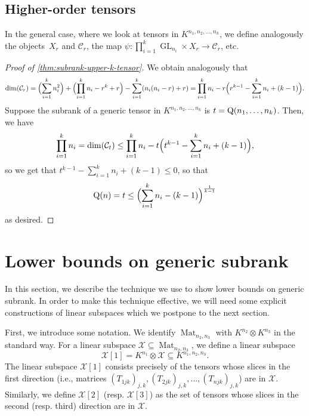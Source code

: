 \documentclass[11pt]{article}
\theoremstyle{definition}
\theoremstyle{remark}
\newcommand{\gensubrank}{{\rm Q}}
\newcommand{\GL}{\operatorname{GL}}
\newcommand{\Mat}{\operatorname{Mat}}
\begin{document}
\subsection{Higher-order tensors}
In the general case, where we look at tensors in $K^{n_1,n_2,\dots,n_k}$, we define analogously the objects~$X_r$ and $\mathcal{C}_r$, the map $\psi: \prod_{i=1}^k \GL_{n_i} \times X_r \rightarrow \mathcal{C}_r$, etc. 

\begin{proof} [Proof of \autoref{thm:subrank-upper-k-tensor}]
We obtain analogously that 
$$
\dim(\mathcal{C}_r) = \Bigl(\sum_{i=1}^k n_i^2\Bigr) + \Bigl(\prod_{i=1}^k n_i - r^k + r\Bigr) - \sum_{i=1}^k (n_i(n_i - r) + r) = \prod_{i=1}^k n_i - r\Bigl(r^{k-1} - \sum_{i=1}^k n_i + (k-1)\Bigr).
$$
Suppose the subrank of a generic tensor in $K^{n_1,n_2,\dots,n_k}$ is $t = \gensubrank(n_1,\ldots,n_k)$. Then, we have
$$
\prod_{i=1}^k n_i = \dim(\mathcal{C}_t) \leq \prod_{i=1}^k n_i - t\Bigl(t^{k-1} - \sum_{i=1}^k n_i + (k-1)\Bigr),
$$
so we get that $t^{k-1} - \sum_{i=1}^k n_i + (k-1) \leq 0$, so that 
\[
\gensubrank(n) = t \leq \Bigl(\sum_{\smash{i=1}}^k n_i - (k-1)\Bigr)^{\frac{1}{k-1}}
\]
as desired.
\end{proof}












\section{Lower bounds on generic subrank}\label{sec:lower-bounds}

In this section, we describe the technique we use to show lower bounds on generic subrank. In order to make this technique effective, we will need some explicit constructions of linear subspaces which we postpone to the next section. 

First, we introduce some notation. We identify $\Mat_{n_2,n_3}$ with $K^{n_2} \otimes K^{n_3}$ in the standard way. For a linear subspace $\mathcal{X} \subseteq \Mat_{n_2,n_3}$, we define a linear subspace
$$
\mathcal{X}[1] = K^{n_1} \otimes \mathcal{X} \subseteq K^{n_1,n_2,n_3}.
$$
The linear subspace $\mathcal{X}[1]$ consists precisely of the tensors whose slices in the first direction (i.e., matrices $(T_{1jk})_{j,k},(T_{2jk})_{j,k},\dots,(T_{njk})_{j,k}$) are in $\mathcal{X}$. Similarly, we define $\mathcal{X}[2]$ (resp. $\mathcal{X}[3]$)  as the set of tensors whose slices in the second (resp. third) direction are in $\mathcal{X}$.
\end{document}
